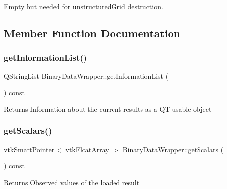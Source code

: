 Empty but needed for unstructured\+Grid destruction. 



\subsection{Member Function Documentation}
\mbox{\label{classBinaryDataWrapper_a7b0d2b52b89c0edf1bfdecf808179efa}} 
\subsubsection{\texorpdfstring{get\+Information\+List()}{getInformationList()}}
{\footnotesize\ttfamily Q\+String\+List Binary\+Data\+Wrapper\+::get\+Information\+List (\begin{DoxyParamCaption}{ }\end{DoxyParamCaption}) const}

\begin{DoxyReturn}{Returns}
Information about the current results as a QT usable object 
\end{DoxyReturn}
\mbox{\label{classBinaryDataWrapper_a047b8ec79270082144bcb1c990bc4a91}} 
\subsubsection{\texorpdfstring{get\+Scalars()}{getScalars()}}
{\footnotesize\ttfamily vtk\+Smart\+Pointer$<$ vtk\+Float\+Array $>$ Binary\+Data\+Wrapper\+::get\+Scalars (\begin{DoxyParamCaption}{ }\end{DoxyParamCaption}) const}

\begin{DoxyReturn}{Returns}
Observed values of the loaded result 
\end{DoxyReturn}
\mbox{\label{classBinaryDataWrapper_a4ab331926387a422e4275f57f37f8f5e}} 
